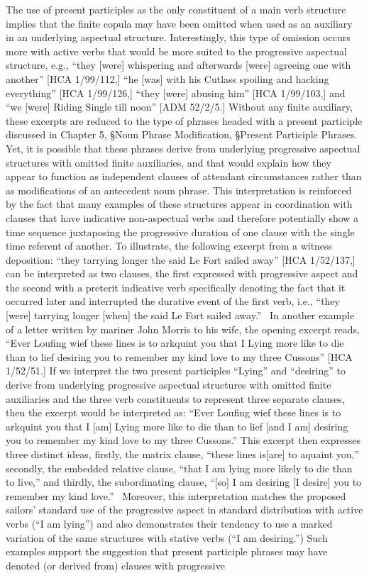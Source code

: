 \begin{styleStandard}
The use of present participles as the only constituent of a main verb structure implies that the finite copula may have been omitted when used as an auxiliary in an underlying aspectual structure. Interestingly, this type of omission occurs more with active verbs that would be more suited to the progressive aspectual structure, e.g., “they [were] whispering and afterwards [were] agreeing one with another” [HCA 1/99/112,] “he [was] with his Cutlass spoiling and hacking everything” [HCA 1/99/126,] “they [were] abusing him” [HCA 1/99/103,] and “we [were] Riding Single till noon” [ADM 52/2/5.] Without any finite auxiliary, these excerpts are reduced to the type of phrases headed with a present participle discussed in Chapter 5, §Noun Phrase Modification, §Present Participle Phrases. Yet, it is possible that these phrases derive from underlying progressive aspectual structures with omitted finite auxiliaries, and that would explain how they appear to function as independent clauses of attendant circumstances rather than as modifications of an antecedent noun phrase. This interpretation is reinforced by the fact that many examples of these structures appear in coordination with clauses that have indicative non-aspectual verbs and therefore potentially show a time sequence juxtaposing the progressive duration of one clause with the single time referent of another. To illustrate, the following excerpt from a witness deposition: “they tarrying longer the said Le Fort sailed away” [HCA 1/52/137,] can be interpreted as two clauses, the first expressed with progressive aspect and the second with a preterit indicative verb specifically denoting the fact that it occurred later and interrupted the durative event of the first verb, i.e., “they [were] tarrying longer [when] the said Le Fort sailed away.” \ In another example of a letter written by mariner John Morris to his wife, the opening excerpt reads, “Ever Loufing wief these lines is to arkquint you that I Lying more like to die than to lief desiring you to remember my kind love to my three Cussons” [HCA 1/52/51.] If we interpret the two present participles “Lying” and “desiring” to derive from underlying progressive aspectual structures with omitted finite auxiliaries and the three verb constituents to represent three separate clauses, then the excerpt would be interpreted as: “Ever Loufing wief these lines is to arkquint you that I [am] Lying more like to die than to lief [and I am] desiring you to remember my kind love to my three Cussons.” This excerpt then expresses three distinct ideas, firstly, the matrix clause, “these lines is[are] to aquaint you,” secondly, the embedded relative clause, “that I am lying more likely to die than to live,” and thirdly, the subordinating clause, “[so] I am desiring [I desire] you to remember my kind love.” \ Moreover, this interpretation matches the proposed sailors’ standard use of the progressive aspect in standard distribution with active verbs (“I am lying”) and also demonstrates their tendency to use a marked variation of the same structures with stative verbs (“I am desiring.”) Such examples support the suggestion that present participle phrases may have denoted (or derived from) clauses with progressive 
\end{styleStandard}
